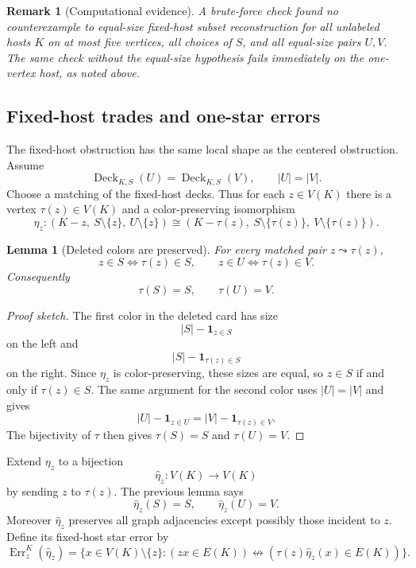 \documentclass[11pt]{article}
\newtheorem{lemma}{Lemma}
\newtheorem{remark}{Remark}
\newcommand{\Deck}{\operatorname{Deck}}
\newcommand{\Err}{\operatorname{Err}}
\newcommand{\one}{\mathbf{1}}
\begin{document}
\begin{remark}[Computational evidence]
A brute-force check found no counterexample to equal-size fixed-host subset
reconstruction for all unlabeled hosts \(K\) on at most five vertices, all
choices of \(S\), and all equal-size pairs \(U,V\).  The same check without
the equal-size hypothesis fails immediately on the one-vertex host, as noted
above.
\end{remark}

\subsection{Fixed-host trades and one-star errors}

The fixed-host obstruction has the same local shape as the centered
obstruction.  Assume
\[
  \Deck_{K,S}(U)=\Deck_{K,S}(V),
  \qquad |U|=|V|.
\]
Choose a matching of the fixed-host decks.  Thus for each \(z\in V(K)\) there
is a vertex \(\tau(z)\in V(K)\) and a color-preserving isomorphism
\[
  \eta_z:
  (K-z,\ S\setminus\{z\},\ U\setminus\{z\})
  \cong
  (K-\tau(z),\ S\setminus\{\tau(z)\},\ V\setminus\{\tau(z)\}).
\]

\begin{lemma}[Deleted colors are preserved]
For every matched pair \(z\leadsto \tau(z)\),
\[
  z\in S \Longleftrightarrow \tau(z)\in S,
  \qquad
  z\in U \Longleftrightarrow \tau(z)\in V.
\]
Consequently
\[
  \tau(S)=S,
  \qquad
  \tau(U)=V.
\]
\end{lemma}

\begin{proof}[Proof sketch]
The first color in the deleted card has size
\[
  |S|-\one_{z\in S}
\]
on the left and
\[
  |S|-\one_{\tau(z)\in S}
\]
on the right.  Since \(\eta_z\) is color-preserving, these sizes are equal,
so \(z\in S\) if and only if \(\tau(z)\in S\).  The same argument for the
second color uses \(|U|=|V|\) and gives
\[
  |U|-\one_{z\in U}
  =
  |V|-\one_{\tau(z)\in V}.
\]
The bijectivity of \(\tau\) then gives \(\tau(S)=S\) and \(\tau(U)=V\).
\end{proof}

Extend \(\eta_z\) to a bijection
\[
  \widehat\eta_z:V(K)\to V(K)
\]
by sending \(z\) to \(\tau(z)\).  The previous lemma says
\[
  \widehat\eta_z(S)=S,
  \qquad
  \widehat\eta_z(U)=V.
\]
Moreover \(\widehat\eta_z\) preserves all graph adjacencies except possibly
those incident to \(z\).  Define its fixed-host star error by
\[
  \Err^{K}_z(\widehat\eta_z)
  =
  \{x\in V(K)\setminus\{z\}:
    (zx\in E(K))
    \not\leftrightarrow
    (\tau(z)\widehat\eta_z(x)\in E(K))
  \}.
\]
\end{document}
